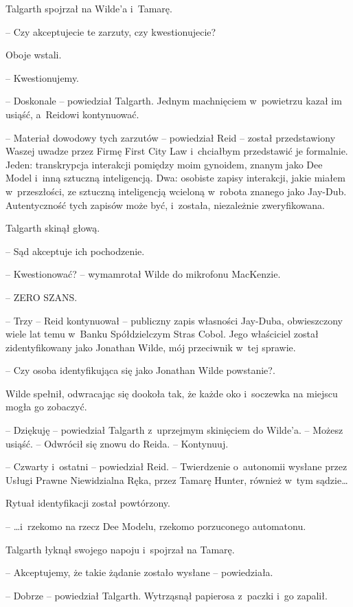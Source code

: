 \documentclass[oneside,polish,11pt,sfheadings]{mwbk}
\begin{document}
Talgarth spojrzał na Wilde'a i~Tamarę.

-- Czy akceptujecie te zarzuty, czy kwestionujecie?

Oboje wstali. 

-- Kwestionujemy.

-- Doskonale -- powiedział Talgarth. Jednym machnięciem w~powietrzu kazał
im usiąść, a~Reidowi kontynuować.

-- Materiał dowodowy tych zarzutów -- powiedział Reid -- został
przedstawiony Waszej uwadze przez Firmę First City Law i~chciałbym
przedstawić je formalnie. Jeden: transkrypcja interakcji pomiędzy moim
gynoidem, znanym jako Dee Model i~inną sztuczną inteligencją. Dwa:
osobiste zapisy interakcji, jakie miałem w~przeszłości, ze sztuczną
inteligencją wcieloną w~robota znanego jako Jay-Dub. Autentyczność tych
zapisów może być, i~została, niezależnie zweryfikowana.

Talgarth skinął głową. 

-- Sąd akceptuje ich pochodzenie.

-- Kwestionować? -- wymamrotał Wilde do mikrofonu MacKenzie.

-- ZERO SZANS.

-- Trzy -- Reid kontynuował -- publiczny zapis własności Jay-Duba,
obwieszczony wiele lat temu w~Banku Spółdzielczym Stras Cobol. Jego
właściciel został zidentyfikowany jako Jonathan Wilde, mój przeciwnik w~tej sprawie.

-- Czy osoba identyfikująca się jako Jonathan Wilde powstanie?.

Wilde spełnił, odwracając się dookoła tak, że każde oko i~soczewka na
miejscu mogła go zobaczyć.

-- Dziękuję -- powiedział Talgarth z~uprzejmym skinięciem do Wilde'a. -- Możesz usiąść. -- Odwrócił się znowu do Reida. -- Kontynuuj.

-- Czwarty i~ostatni -- powiedział Reid. -- Twierdzenie o~autonomii wysłane
przez Usługi Prawne Niewidzialna Ręka, przez Tamarę Hunter, również w~tym sądzie\ldots

Rytuał identyfikacji został powtórzony.

-- \ldots i~rzekomo na rzecz Dee Modelu, rzekomo porzuconego automatonu.

Talgarth łyknął swojego napoju i~spojrzał na Tamarę.

-- Akceptujemy, że takie żądanie zostało wysłane -- powiedziała.

-- Dobrze -- powiedział Talgarth. Wytrząsnął papierosa z~paczki i~go
zapalił.
\end{document}
